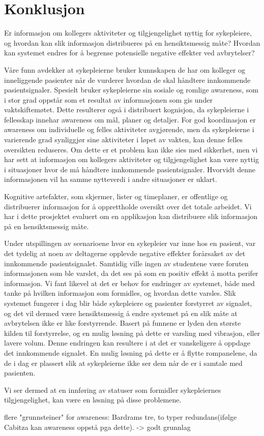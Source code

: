 \chapter{Konklusjon}
\label{chp:konklusjon}


Er informasjon om kollegers aktiviteter og tilgjengelighet nyttig for sykepleiere, og hvordan kan slik informasjon distribueres på en hensiktsmessig måte? 
Hvordan kan systemet endres for å begrense potensielle negative effekter ved avbrytelser?

Våre funn avdekker at sykepleierne bruker kunnskapen de har om kolleger og inneliggende pasienter når de vurderer hvordan de skal håndtere innkommende pasientsignaler. Spesielt bruker sykepleierne sin sosiale og romlige awareness, som i stor grad oppstår som et resultat av informasjonen som gis under vaktskiftemøtet. Dette resulterer også i distribuert kognisjon, da sykepleierne i fellesskap innehar awareness om mål, planer og detaljer. For god koordinasjon er awareness om individuelle og felles aktiviteter avgjørende, men da sykepleierne i varierende grad synliggjør sine aktiviteter i løpet av vakten, kan denne felles oversikten reduseres. Om dette er et problem kan ikke sies med sikkerhet, men vi har sett at informasjon om kollegers aktiviteter og tilgjengelighet kan være nyttig i situasjoner hvor de må håndtere innkommende pasientsignaler. Hvorvidt denne informasjonen vil ha samme nytteverdi i andre situasjoner er uklart.

\noindent
Kognitive artefakter, som skjermer, lister og timeplaner, er offentlige og distribuerer informasjon for å opprettholde oversikt over det totale arbeidet. Vi har i dette prosjektet evaluert om en applikasjon kan distribuere slik informasjon på en hensiktsmessig måte.  

\noindent
Under utspillingen av scenarioene hvor en sykepleier var inne hos en pasient, var det tydelig at noen av deltagerne opplevde negative effekter forårsaket av det innkommende pasientsignalet. Samtidig ville ingen av studentene være foruten informasjonen som ble varslet, da det ses på som en positiv effekt å motta perifer informasjon.
Vi fant likevel at det er behov for endringer av systemet, både med tanke på hvilken informasjon som formidles, og hvordan dette varsles. Slik systemet fungerer i dag blir både sykepleiere og pasienter forstyrret av signalet, og det vil dermed være hensiktsmessig å endre systemet på en slik måte at avbrytelsen ikke er like forstyrrende. Basert på funnene er lyden den største kilden til forstyrrelse, og en mulig løsning på dette er varsling med vibrasjon, eller lavere volum. Denne endringen kan resultere i at det er vanskeligere å oppdage det innkommende signalet. En mulig løsning på dette er å flytte rompanelene, da de i dag er plassert slik at sykepleierne ikke ser dem når de er i samtale med pasienten. 


Vi ser dermed at en innføring av statuser som formidler sykepleiernes tilgjengelighet, kan være en løsning på disse problemene.  

flere "grunnsteiner" for awareness: Bardrams tre, to typer redundans(ifølge Cabitza kan awareness oppstå pga dette). -> godt grunnlag